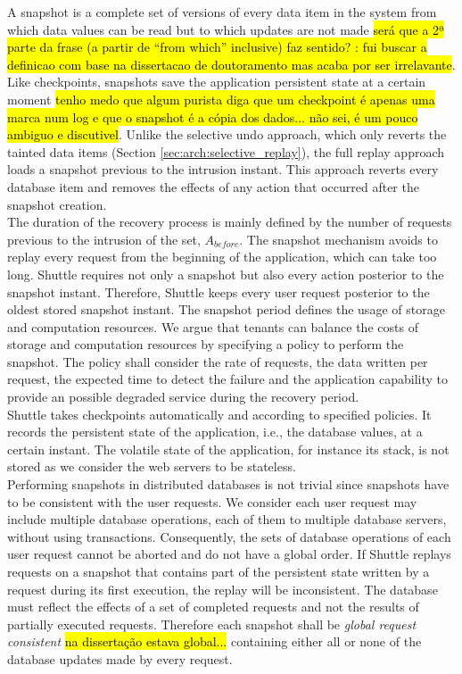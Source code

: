 A snapshot is a complete set of versions of every data item in the system from which data values can be read but to which updates are not made \hl{será que a 2ª parte da frase (a partir de “from which” inclusive) faz sentido? : fui buscar a definicao com base na dissertacao de doutoramento mas acaba por ser irrelavante}. Like checkpoints, snapshots save the application persistent state at a certain moment \hl{tenho medo que algum purista diga que um checkpoint é apenas uma marca num log e que o snapshot é a cópia dos dados... não sei, é um pouco ambiguo e discutivel}. Unlike the selective undo approach, which only reverts the tainted data items (Section \ref{sec:arch:selective_replay}), the full replay approach loads a snapshot previous to the intrusion instant. This approach reverts every database item and removes the effects of any action that occurred after the snapshot creation. \\

The duration of the recovery process is mainly defined by the number of requests previous to the intrusion of the set, $A_{before}$. The snapshot mechanism avoids to replay every request from the beginning of the application, which can take too long. Shuttle requires not only a snapshot but also every action posterior to the snapshot instant. Therefore, Shuttle keeps every user request posterior to the oldest stored snapshot instant. The snapshot period defines the usage of storage and computation resources. We argue that tenants can balance the costs of storage and computation resources by specifying a policy to perform the snapshot. The policy shall consider the rate of requests, the data written per request, the expected time to detect the failure and the application capability to provide an possible degraded service during the recovery period. \\

Shuttle takes checkpoints automatically and according to specified policies. It records the persistent state of the application, i.e., the database values, at a certain instant. The volatile state of the application, for instance its stack, is not stored as we consider the web servers to be stateless. \\


Performing snapshots in distributed databases is not trivial since snapshots have to be consistent with the user requests.  We consider each user request may include multiple database operations, each of them to multiple database servers, without using transactions. Consequently, the sets of database operations of each user request cannot be aborted and do not have a global order. If Shuttle replays requests on a snapshot that contains part of the persistent state written by a request during its first execution, the replay will be inconsistent. The database must reflect the effects of a set of completed requests and not the results of partially executed requests. Therefore each snapshot shall be \emph{global request consistent} \hl{na dissertação estava global...} containing either all or none of the database updates made by every request.

